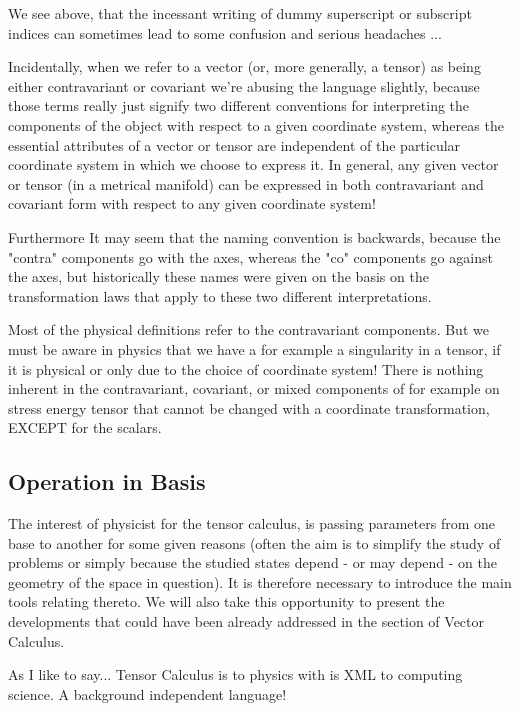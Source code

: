 	\begin{tcolorbox}[title=Remark,colframe=black,arc=10pt]
	We see above, that the incessant writing  of dummy superscript or subscript indices  can sometimes lead to some confusion and serious headaches ...
	\end{tcolorbox}
	Incidentally, when we refer to a vector (or, more generally, a tensor) as being either contravariant or covariant we're abusing the language slightly, because those terms really just signify two different conventions for interpreting the components of the object with respect to a given coordinate system, whereas the essential attributes of a vector or tensor are independent of the particular coordinate system in which we choose to express it. In general, any given vector or tensor (in a metrical manifold) can be expressed in both contravariant and covariant form with respect to any given coordinate system!
	
	Furthermore It may seem that the naming convention is backwards, because the "contra" components go with the axes, whereas the "co" components go against the axes, but historically these names were given on the basis on the transformation laws that apply to these two different interpretations.
	
	Most of the physical definitions refer to the contravariant components. But we must be aware in physics that we have a for example a singularity in a tensor, if it is physical or only due to the choice of coordinate system! There is nothing inherent in the contravariant, covariant, or mixed components of for example on stress energy tensor that cannot be changed with a coordinate transformation, EXCEPT for the scalars. 
	
	\pagebreak
	\subsection{Operation in Basis}
	The interest of physicist for the tensor calculus, is passing parameters from one base to another for some given reasons (often the aim is to simplify the study of problems or simply because the studied states depend - or may depend - on the geometry of the space in question). It is therefore necessary to introduce the main tools relating thereto. We will also take this opportunity to present the developments that could have been already addressed in the section of Vector Calculus.
	\begin{tcolorbox}[title=Remark,colframe=black,arc=10pt]
	As I like to say... Tensor Calculus is to physics with is XML to computing science. A background independent language!
	\end{tcolorbox}
	
